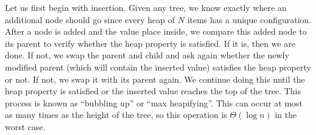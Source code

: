 Let us first begin with insertion. Given any tree, we know exactly where an additional node should go since every heap of $N$ items has a unique configuration. After a node is added and the value place inside, we compare this added node to its parent to verify whether the heap property is satisfied. If it is, then we are done. If not, we swap the parent and child and ask again whether the newly modified parent (which will contain the inserted value) satisfies the heap property or not. If not, we swap it with its parent again. We continue doing this until the heap property is satisfied or the inserted value reaches the top of the tree. This process is known as ``bubbling up'' or ``max heapifying''. This can occur at most as many times as the height of the tree, so this operation is $\Theta(\log n)$ in the worst case.

